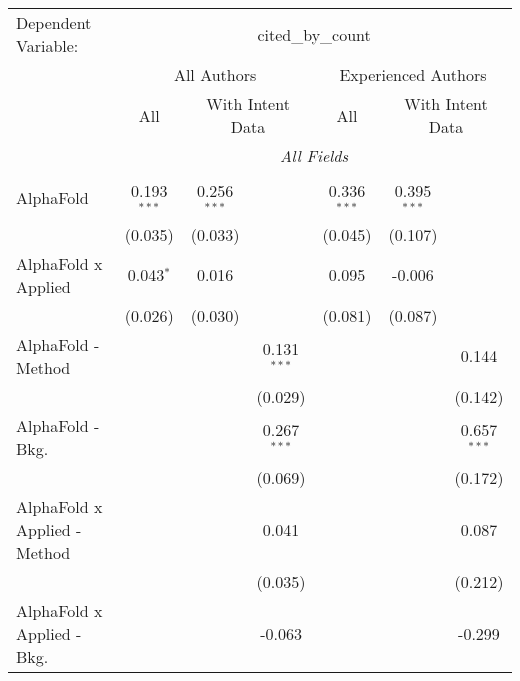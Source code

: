 \begingroup
\centering
\begin{tabular}{lcccccc}
   \tabularnewline \midrule \midrule
   Dependent Variable: & \multicolumn{6}{c}{cited\_by\_count}\\
 & \multicolumn{3}{c}{All Authors} & \multicolumn{3}{c}{Experienced Authors} \\
\cmidrule(lr){2-4} \cmidrule(lr){5-7}
 & \multicolumn{1}{c}{All} & \multicolumn{2}{c}{With Intent Data} & \multicolumn{1}{c}{All} & \multicolumn{2}{c}{With Intent Data} \\
\cmidrule(lr){2-2} \cmidrule(lr){3-4} \cmidrule(lr){5-5} \cmidrule(lr){6-7}
 & \multicolumn{6}{c}{\textit{All Fields}} \\ \\
   AlphaFold                      & 0.193$^{***}$ & 0.256$^{***}$ &               & 0.336$^{***}$ & 0.395$^{***}$ &   \\   
                                  & (0.035)       & (0.033)       &               & (0.045)       & (0.107)       &   \\   
   AlphaFold x Applied            & 0.043$^{*}$   & 0.016         &               & 0.095         & -0.006        &   \\   
                                  & (0.026)       & (0.030)       &               & (0.081)       & (0.087)       &   \\   
   AlphaFold - Method             &               &               & 0.131$^{***}$ &               &               & 0.144\\   
                                  &               &               & (0.029)       &               &               & (0.142)\\   
   AlphaFold - Bkg.               &               &               & 0.267$^{***}$ &               &               & 0.657$^{***}$\\   
                                  &               &               & (0.069)       &               &               & (0.172)\\   
   AlphaFold x Applied - Method   &               &               & 0.041         &               &               & 0.087\\   
                                  &               &               & (0.035)       &               &               & (0.212)\\   
   AlphaFold x Applied - Bkg.     &               &               & -0.063        &               &               & -0.299\\   

\end{tabular}
